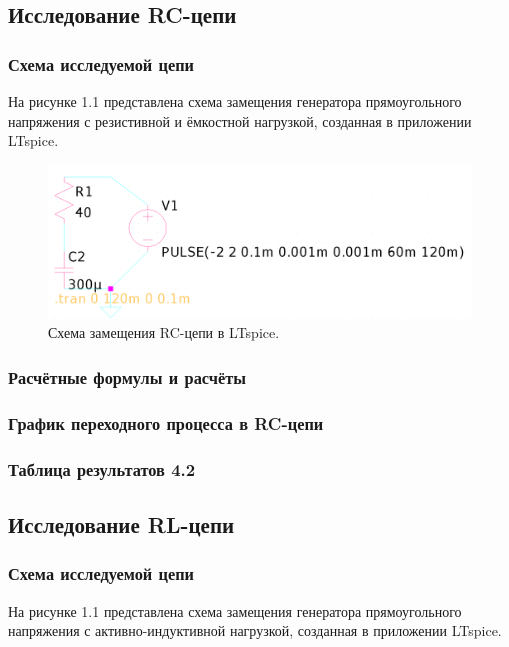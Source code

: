 \subsection{Исследование RC-цепи}

\subsubsection{Схема исследуемой цепи}
На рисунке 1.1 представлена схема замещения генератора прямоугольного напряжения с резистивной и ёмкостной нагрузкой, созданная в приложении LTspice.

\begin{figure}[H]
	\centering
	\includegraphics[width=1\textwidth]{./data/rc-schema.png}
	\caption{Схема замещения RC-цепи в LTspice.}
\end{figure}

\subsubsection{Расчётные формулы и расчёты}


\subsubsection{График переходного процесса в RC-цепи}


\subsubsection{Таблица результатов 4.2}





\subsection{Исследование RL-цепи}

\subsubsection{Схема исследуемой цепи}
На рисунке 1.1 представлена схема замещения генератора прямоугольного напряжения с активно-индуктивной нагрузкой, созданная в приложении LTspice.

